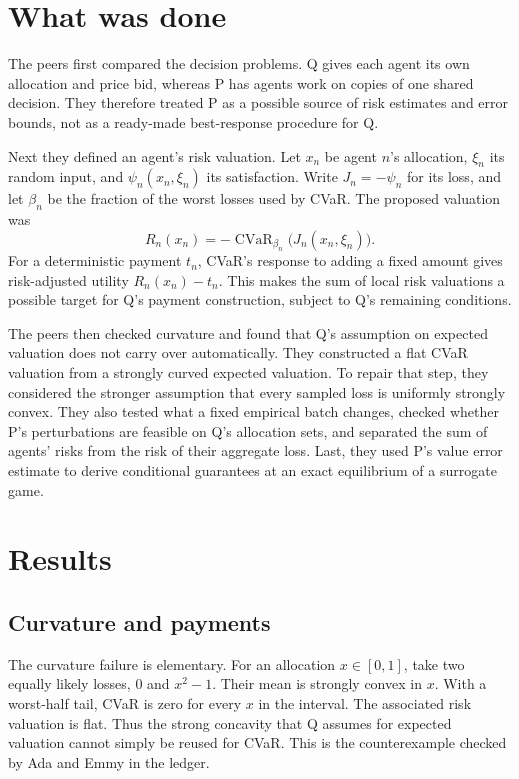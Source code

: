 \documentclass{article}
\begin{document}
\section{What was done}

The peers first compared the decision problems. Q gives each agent its own allocation and price bid, whereas
P has agents work on copies of one shared decision. They therefore treated P as a possible source of risk
estimates and error bounds, not as a ready-made best-response procedure for Q.

Next they defined an agent's risk valuation. Let \(x_n\) be agent \(n\)'s allocation, \(\xi_n\) its random
input, and \(\psi_n(x_n,\xi_n)\) its satisfaction. Write \(J_n=-\psi_n\) for its loss, and let \(\beta_n\)
be the fraction of the worst losses used by CVaR. The proposed valuation was
\[
R_n(x_n)=-\operatorname{CVaR}_{\beta_n}
  \bigl(J_n(x_n,\xi_n)\bigr).
\]
For a deterministic payment \(t_n\), CVaR's response to adding a fixed amount gives risk-adjusted utility
\(R_n(x_n)-t_n\). This makes the sum of local risk valuations a possible target for Q's payment
construction, subject to Q's remaining conditions.

The peers then checked curvature and found that Q's assumption on expected valuation does not carry over
automatically. They constructed a flat CVaR valuation from a strongly curved expected valuation. To repair
that step, they considered the stronger assumption that every sampled loss is uniformly strongly convex.
They also tested what a fixed empirical batch changes, checked whether P's perturbations are feasible on Q's
allocation sets, and separated the sum of agents' risks from the risk of their aggregate loss. Last, they
used P's value error estimate to derive conditional guarantees at an exact equilibrium of a surrogate game.

\section{Results}

\subsection{Curvature and payments}

The curvature failure is elementary. For an allocation \(x\in[0,1]\), take two equally likely losses, \(0\)
and \(x^2-1\). Their mean is strongly convex in \(x\). With a worst-half tail, CVaR is zero for every \(x\)
in the interval. The associated risk valuation is flat. Thus the strong concavity that Q assumes for
expected valuation cannot simply be reused for CVaR. This is the counterexample checked by Ada and Emmy in
the ledger.
\end{document}

